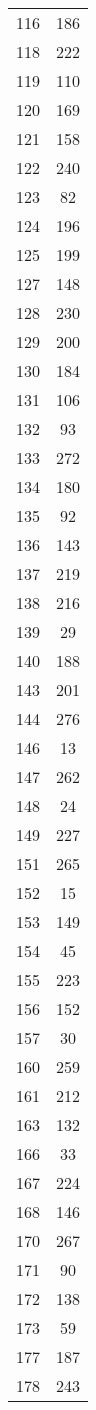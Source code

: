 \documentclass[10pt,letterpaper]{article}\usepackage[]{graphicx}\usepackage[]{color}
\begin{document}
\begin{center}
\begin{longtable}[c]{cc}
		116	& 186 \\
		118	& 222 \\
		119	& 110 \\
		120	& 169 \\
		121	& 158 \\
		122	& 240 \\
		123	& 82 \\
		124	& 196 \\
		125	& 199 \\
		127	& 148 \\
		128	& 230 \\
		129	& 200 \\
		130	& 184 \\
		131	& 106 \\
		132	& 93 \\
		133	& 272 \\
		134	& 180 \\
		135	& 92 \\
		136	& 143 \\
		137	& 219 \\
		138	& 216 \\
		139	& 29 \\
		140	& 188 \\
		143	& 201 \\
		144	& 276 \\
		146	& 13 \\
		147	& 262 \\
		148	& 24 \\
		149	& 227 \\
		151	& 265 \\
		152	& 15 \\
		153	& 149 \\
		154	& 45 \\
		155	& 223 \\
		156	& 152 \\
		157	& 30 \\
		160	& 259 \\
		161	& 212 \\
		163	& 132 \\
		166	& 33 \\
		167	& 224 \\
		168	& 146 \\
		170	& 267 \\
		171	& 90 \\
		172	& 138 \\
		173	& 59 \\
		177	& 187 \\
		178	& 243 \\

\end{longtable}
\end{center}
\end{document}
